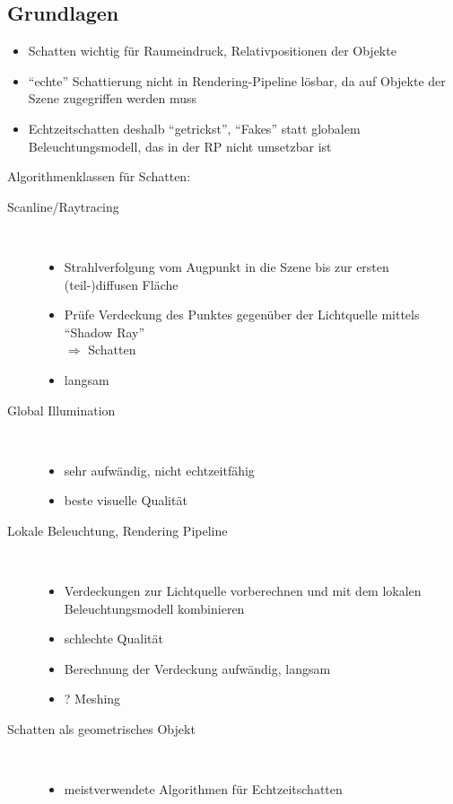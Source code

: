 \documentclass[a4paper, 12pt]{article}
\begin{document}
\subsection{Grundlagen}
\begin{itemize}
  \item Schatten wichtig für Raumeindruck, Relativpositionen der Objekte
  \item ``echte'' Schattierung nicht in Rendering-Pipeline lösbar, da auf Objekte der Szene zugegriffen werden muss
  \item Echtzeitschatten deshalb ``getrickst'', ``Fakes'' statt globalem Beleuchtungsmodell, das in der RP nicht umsetzbar ist
\end{itemize}
Algorithmenklassen für Schatten:
\begin{description}
  \item[Scanline/Raytracing]~
    \begin{itemize}
      \item Strahlverfolgung vom Augpunkt in die Szene bis zur ersten (teil-)diffusen Fläche
      \item Prüfe Verdeckung des Punktes gegenüber der Lichtquelle mittels ``Shadow Ray''\\\(\Rightarrow\) Schatten
    \end{itemize}
    \begin{itemize}
      \renewcommand{\labelitemi}{\(-\)}%
      \item langsam
    \end{itemize}
  \item[Global Illumination]~
    \begin{itemize}
      \renewcommand{\labelitemi}{\(-\)}%
      \item sehr aufwändig, nicht echtzeitfähig
    \end{itemize}
    \begin{itemize}
      \renewcommand{\labelitemi}{+}%
      \item beste visuelle Qualität
    \end{itemize}
  \item[Lokale Beleuchtung, Rendering Pipeline]~
    \begin{itemize}
      \item Verdeckungen zur Lichtquelle vorberechnen und mit dem lokalen Beleuchtungsmodell kombinieren
    \end{itemize}
    \begin{itemize}
      \renewcommand{\labelitemi}{\(-\)}%
      \item schlechte Qualität
      \item Berechnung der Verdeckung aufwändig, langsam
      \item ? Meshing
    \end{itemize}
  \item[Schatten als geometrisches Objekt]~
    \begin{itemize}
      \item meistverwendete Algorithmen für Echtzeitschatten
    \end{itemize}
\end{description}
\end{document}
